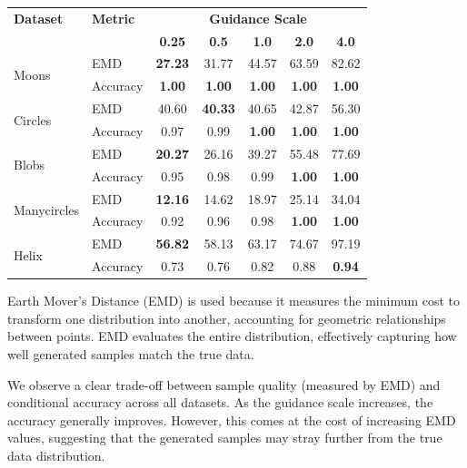\documentclass[11pt]{article}
\begin{document}
\begin{longtable}{|l|l|c|c|c|c|c|}
    \hline
    \textbf{Dataset} & \textbf{Metric} & \multicolumn{5}{c|}{\textbf{Guidance Scale}} \\
    \cline{3-7}
    & & \textbf{0.25} & \textbf{0.5} & \textbf{1.0} & \textbf{2.0} & \textbf{4.0} \\
    \hline
    \multirow{2}{*}{Moons} & EMD & \textbf{27.23} & 31.77 & 44.57 & 63.59 & 82.62 \\
    \cline{2-7}
    & Accuracy & \textbf{1.00} & \textbf{1.00} & \textbf{1.00} & \textbf{1.00} & \textbf{1.00} \\
    \hline
    \multirow{2}{*}{Circles} & EMD & 40.60 & \textbf{40.33} & 40.65 & 42.87 & 56.30 \\
    \cline{2-7}
    & Accuracy & 0.97 & 0.99 & \textbf{1.00} & \textbf{1.00} & \textbf{1.00} \\
    \hline
    \multirow{2}{*}{Blobs} & EMD & \textbf{20.27} & 26.16 & 39.27 & 55.48 & 77.69 \\
    \cline{2-7}
    & Accuracy & 0.95 & 0.98 & 0.99 & \textbf{1.00} & \textbf{1.00} \\
    \hline
    \multirow{2}{*}{Manycircles} & EMD & \textbf{12.16} & 14.62 & 18.97 & 25.14 & 34.04 \\
    \cline{2-7}
    & Accuracy & 0.92 & 0.96 & 0.98 & \textbf{1.00} & \textbf{1.00} \\
    \hline
    \multirow{2}{*}{Helix} & EMD & \textbf{56.82} & 58.13 & 63.17 & 74.67 & 97.19 \\
    \cline{2-7}
    & Accuracy & 0.73 & 0.76 & 0.82 & 0.88 & \textbf{0.94} \\
    \hline
\end{longtable}
\label{tab:cfg_results}

Earth Mover's Distance (EMD) is used because it measures the minimum cost to transform one distribution into another, accounting for geometric relationships between points. EMD evaluates the entire distribution, effectively capturing how well generated samples match the true data.

We observe a clear trade-off between sample quality (measured by EMD) and conditional accuracy across all datasets. As the guidance scale increases, the accuracy generally improves. However, this comes at the cost of increasing EMD values, suggesting that the generated samples may stray further from the true data distribution.
\end{document}
